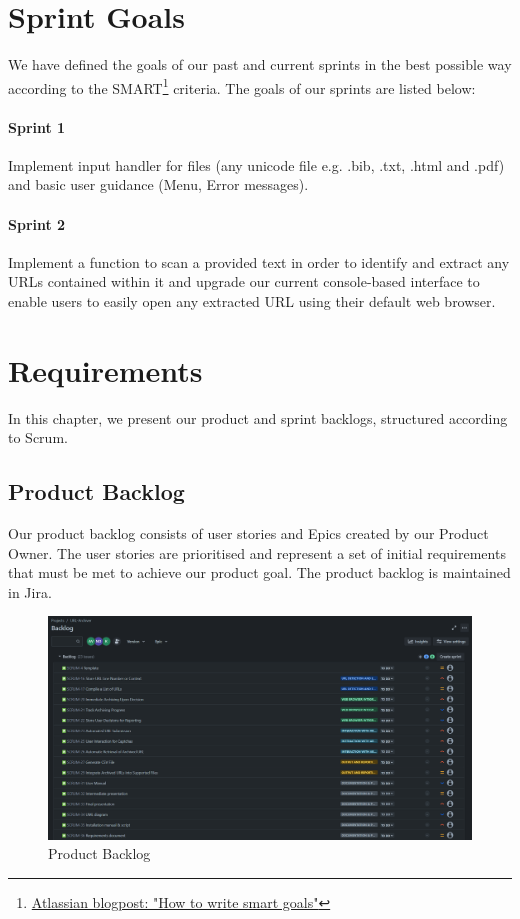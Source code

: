 \section{Sprint Goals}
We have defined the goals of our past and current sprints in the best possible way according to the SMART\footnote{\href{https://www.atlassian.com/blog/productivity/how-to-write-smart-goals}{Atlassian blogpost: "How to write smart goals"}} criteria. The goals of our sprints are listed below:

\paragraph{Sprint 1}
Implement input handler for files (any unicode file e.g. .bib, .txt, .html and .pdf) and basic user guidance (Menu, Error messages).

\paragraph{Sprint 2}
Implement a function to scan a provided text in order to identify and extract any URLs contained within it and upgrade our current console-based interface to enable users to easily open any extracted URL using their default web browser.

\clearpage


\section{Requirements}
In this chapter, we present our product and sprint backlogs, structured according to Scrum.

\subsection{Product Backlog}
Our product backlog consists of user stories and Epics created by our Product Owner.
The user stories are prioritised and represent a set of initial requirements that must be met to achieve our product goal. The product backlog is maintained in Jira.
\begin{figure}[h!]
    \centering
    \includegraphics[width=1\textwidth]{pictures/backlog}
    \caption{Product Backlog}
    \label{fig:backlog}
\end{figure}

